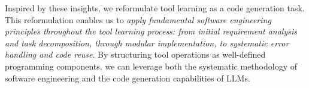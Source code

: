 

Inspired by these insights, we reformulate tool learning as a code generation task. This reformulation enables us to \emph{apply fundamental software engineering principles throughout the tool learning process: from initial requirement analysis and task decomposition, through modular implementation, to systematic error handling and code reuse}. 
By structuring tool operations as well-defined programming components, we can leverage both the systematic methodology of software engineering and the code generation capabilities of LLMs.








